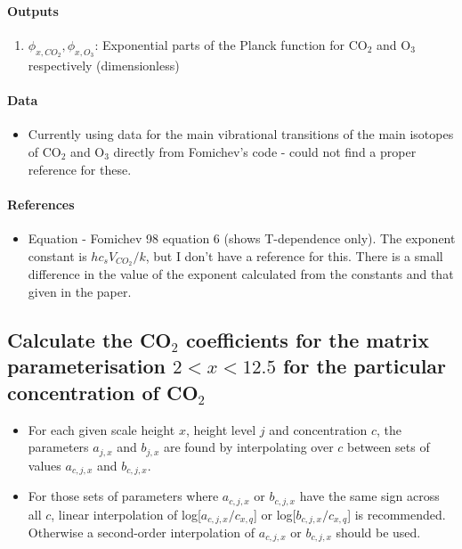    \paragraph{Outputs}
   \begin{enumerate}
   \item $\phi_{x,CO_2}, \phi_{x,O_3}$: Exponential parts of the Planck function 
     for CO$_2$ and O$_3$ respectively (dimensionless)
   \end{enumerate}

   \paragraph{Data}
   \begin{itemize}
   \item Currently using data for the main vibrational transitions of the 
     main isotopes of CO$_2$ and O$_3$ directly from Fomichev's code - 
     could not find a proper reference for these.
   \end{itemize}

   \paragraph{References}
   \begin{itemize}
   \item Equation - Fomichev 98 equation 6 (shows T-dependence
     only). The exponent constant is $hc_sV_{CO_2}/k$, but I don't
     have a reference for this. There is a small difference in the
     value of the exponent calculated from the constants and that
     given in the paper.
   \end{itemize}


\subsection{Calculate the CO$_2$ coefficients for the matrix 
  parameterisation $2 < x < 12.5$ for the particular concentration 
  of CO$_2$}

   \begin{itemize}
   \item For each given scale height $x$, height level $j$ and concentration 
     $c$, the parameters $a_{j,x}$ and $b_{j,x}$ are found by 
     interpolating over $c$ between sets of values $a_{c,j,x}$ and 
     $b_{c,j,x}$.
   \item For those sets of parameters where $a_{c,j,x}$ or $b_{c,j,x}$ have
     the same sign across all $c$, linear interpolation of 
     log[$a_{c,j,x}/c_{x,q}$] or log[$b_{c,j,x}/c_{x,q}$] is recommended. 
     Otherwise a second-order interpolation of $a_{c,j,x}$ or $b_{c,j,x}$ 
     should be used.
   \end{itemize}   
   
